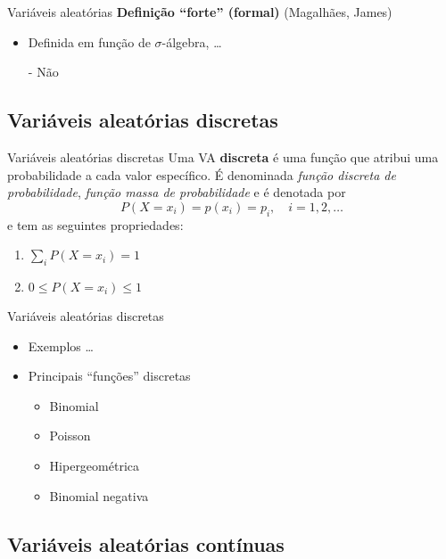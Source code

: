 \documentclass[10pt]{beamer}\usepackage{graphicx, color}
\begin{document}
\begin{frame}{Variáveis aleatórias}
  \textbf{Definição ``forte'' (formal)} (Magalhães, James)
  \begin{itemize}
  \item Definida em função de $\sigma$-álgebra, \ldots
  \item[-] Não
  \end{itemize}
\end{frame}

\subsection[Discretas]{Variáveis aleatórias discretas}
\label{sec:vadisc}

\begin{frame}{Variáveis aleatórias discretas}
  Uma VA \textbf{discreta} é uma função que atribui uma probabilidade a
  cada valor específico. É denominada \textit{função discreta de
    probabilidade}, \textit{função massa de probabilidade} e é denotada por
  \begin{equation*}
    P(X = x_i) = p(x_i) = p_i, \quad i = 1, 2, \ldots
  \end{equation*}
  e tem as seguintes propriedades:
  \begin{enumerate}
  \item $\sum_{i} P(X = x_i) = 1$
  \item $0 \leq P(X = x_i) \leq 1$
  \end{enumerate}
\end{frame}

\begin{frame}{Variáveis aleatórias discretas}
  \begin{itemize}
  \item Exemplos \ldots
  \item Principais ``funções'' discretas
    \begin{itemize}
    \item Binomial
    \item Poisson
    \item Hipergeométrica
    \item Binomial negativa
    \end{itemize}
  \end{itemize}
\end{frame}

\subsection[Contínuas]{Variáveis aleatórias contínuas}
\label{sec:vacont}
\end{document}
